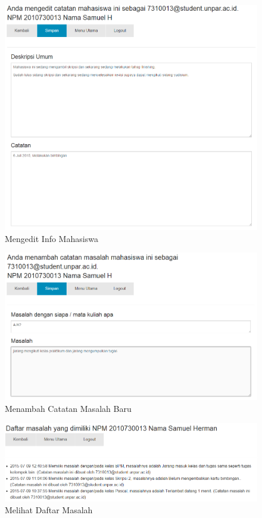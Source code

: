 \begin{figure}[H]
\centering
\includegraphics[scale=0.44]{Gambar/pengujian14.png}
\caption[Mengedit Info Mahasiswa]{Mengedit Info Mahasiswa} 
\label{fig:mengeditinfomahasiswa}
\end{figure}

\begin{figure}[H]
\centering
\includegraphics[scale=0.44]{Gambar/pengujian15.png}
\caption[Menambah Catatan Masalah Baru]{Menambah Catatan Masalah Baru} 
\label{fig:menambahmasalah}
\end{figure}

\begin{figure}[H]
\centering
\includegraphics[scale=0.44]{Gambar/pengujian16.png}
\caption[Melihat Daftar Masalah]{Melihat Daftar Masalah} 
\label{fig:melihatmasalah}
\end{figure}

